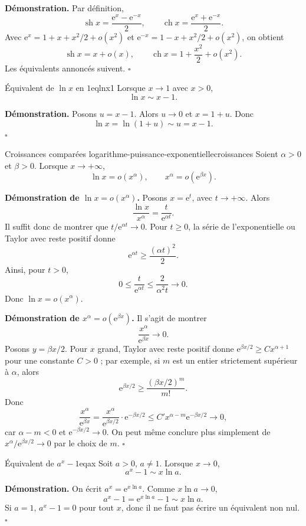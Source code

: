 \documentclass[11pt,a4paper]{article}
\newcommand{\e}{\mathrm{e}}
\DeclareMathOperator{\sh}{sh}
\DeclareMathOperator{\ch}{ch}
\begin{document}
\textbf{Démonstration.} Par définition,
\[
  \sh x=\frac{\e^x-\e^{-x}}2,
  \qquad
  \ch x=\frac{\e^x+\e^{-x}}2.
\]
Avec $\e^x=1+x+x^2/2+o(x^2)$ et $\e^{-x}=1-x+x^2/2+o(x^2)$, on obtient
\[
  \sh x=x+o(x),
  \qquad
  \ch x=1+\frac{x^2}{2}+o(x^2).
\]
Les équivalents annoncés suivent.
\hfill $\square$

\begin{propositionbox}{Équivalent de $\ln x$ en $1$}{eqlnx1}
Lorsque $x\to1$ avec $x>0$,
\[
  \ln x\sim x-1.
\]
\end{propositionbox}

\textbf{Démonstration.} Posons $u=x-1$. Alors $u\to0$ et $x=1+u$. Donc
\[
  \ln x=\ln(1+u)\sim u=x-1.
\]
\hfill $\square$

\begin{propositionbox}{Croissances comparées logarithme-puissance-exponentielle}{croissances}
Soient $\alpha>0$ et $\beta>0$. Lorsque $x\to+\infty$,
\[
  \ln x=o(x^\alpha),
  \qquad
  x^\alpha=o(\e^{\beta x}).
\]
\end{propositionbox}

\textbf{Démonstration de $\ln x=o(x^\alpha)$.} Posons $x=\e^t$, avec $t\to+\infty$. Alors
\[
  \frac{\ln x}{x^\alpha}=\frac{t}{\e^{\alpha t}}.
\]
Il suffit donc de montrer que $t/\e^{\alpha t}\to0$. Pour $t\ge0$, la série de l'exponentielle ou Taylor avec reste positif donne
\[
  \e^{\alpha t}\ge \frac{(\alpha t)^2}{2}.
\]
Ainsi, pour $t>0$,
\[
  0\le \frac{t}{\e^{\alpha t}}\le \frac{2}{\alpha^2 t}\to0.
\]
Donc $\ln x=o(x^\alpha)$.

\textbf{Démonstration de $x^\alpha=o(\e^{\beta x})$.} Il s'agit de montrer
\[
  \frac{x^\alpha}{\e^{\beta x}}\to0.
\]
Posons $y=\beta x/2$. Pour $x$ grand, Taylor avec reste positif donne $\e^{\beta x/2}\ge C x^{\alpha+1}$ pour une constante $C>0$ ; par exemple, si $m$ est un entier strictement supérieur à $\alpha$, alors
\[
  \e^{\beta x/2}\ge \frac{(\beta x/2)^m}{m!}.
\]
Donc
\[
  \frac{x^\alpha}{\e^{\beta x}}=\frac{x^\alpha}{\e^{\beta x/2}}\cdot\e^{-\beta x/2}
\le C' x^{\alpha-m}\e^{-\beta x/2}\to0,
\]
car $\alpha-m<0$ et $\e^{-\beta x/2}\to0$. On peut même conclure plus simplement de $x^\alpha/\e^{\beta x/2}\to0$ par le choix de $m$.
\hfill $\square$

\begin{propositionbox}{Équivalent de $a^x-1$}{eqax}
Soit $a>0$, $a\ne1$. Lorsque $x\to0$,
\[
  a^x-1\sim x\ln a.
\]
\end{propositionbox}

\textbf{Démonstration.} On écrit $a^x=\e^{x\ln a}$. Comme $x\ln a\to0$,
\[
  a^x-1=\e^{x\ln a}-1\sim x\ln a.
\]
Si $a=1$, $a^x-1=0$ pour tout $x$, donc il ne faut pas écrire un équivalent non nul.
\hfill $\square$
\end{document}
